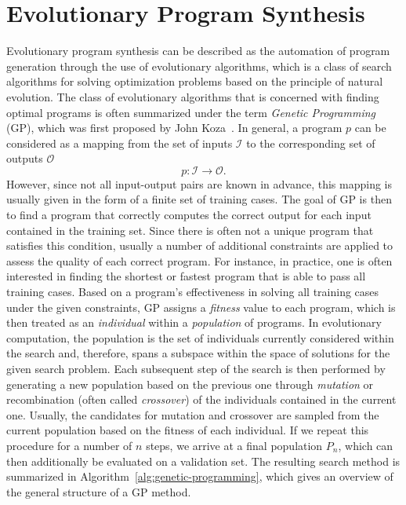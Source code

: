 \section{Evolutionary Program Synthesis}
\label{sec:gggp}
Evolutionary program synthesis can be described as the automation of program generation through the use of evolutionary algorithms, which is a class of search algorithms for solving optimization problems based on the principle of natural evolution.
The class of evolutionary algorithms that is concerned with finding optimal programs is often summarized under the term \emph{Genetic Programming} (GP), which was first proposed by John Koza~\cite{koza1994genetic}.
In general, a program $p$ can be considered as a mapping from the set of inputs $\mathcal{I}$ to the corresponding set of outputs $\mathcal{O}$
\begin{equation}
	p : \mathcal{I} \to \mathcal{O}.
	\label{eq:gp-program}
\end{equation}
However, since not all input-output pairs are known in advance, this mapping is usually given in the form of a finite set of training cases.
The goal of GP is then to find a program that correctly computes the correct output for each input contained in the training set.
Since there is often not a unique program that satisfies this condition, usually a number of additional constraints are applied to assess the quality of each correct program.
For instance, in practice, one is often interested in finding the shortest or fastest program that is able to pass all training cases.
Based on a program's effectiveness in solving all training cases under the given constraints, GP assigns a \emph{fitness} value to each program, which is then treated as an \emph{individual} within a \emph{population} of programs.
In evolutionary computation, the population is the set of individuals currently considered within the search and, therefore, spans a subspace within the space of solutions for the given search problem.
Each subsequent step of the search is then performed by generating a new population based on the previous one through \emph{mutation} or recombination (often called \emph{crossover}) of the individuals contained in the current one.
Usually, the candidates for mutation and crossover are sampled from the current population based on the fitness of each individual.
If we repeat this procedure for a number of $n$ steps, we arrive at a final population $P_n$, which can then additionally be evaluated on a validation set.
The resulting search method is summarized in Algorithm~\ref{alg:genetic-programming}, which gives an overview of the general structure of a GP method.
